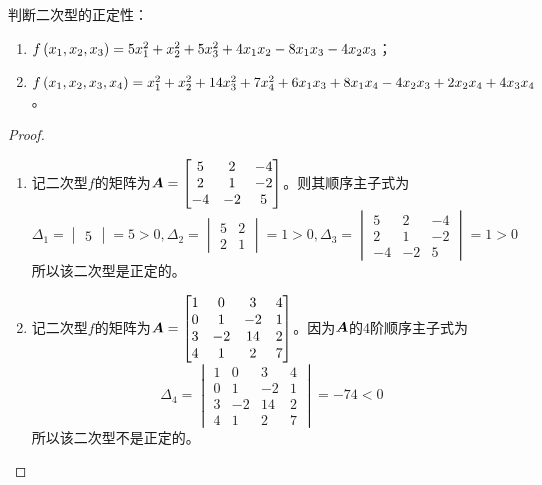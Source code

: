 \begin{problem}
判断二次型的正定性：
\begin{enumerate}
    \item \(f\left( x_1,x_2,x_3 \right)=5x_1^2+x_2^2+5x_3^2+4x_1x_2-8x_1x_3-4x_2x_3\)；
    \item \(f\left( x_1,x_2,x_3,x_4 \right)=x_1^2+x_2^2+14x_3^2+7x_4^2+6x_1x_3+8x_1x_4-4x_2x_3+2x_2x_4+4x_3x_4\)。
\end{enumerate}
\end{problem}
\begin{proof}
    \begin{enumerate}
        \item {
              记二次型\(f\)的矩阵为\(\boldsymbol{A}=\begin{bmatrix}5&2&-4\\2&1&-2\\-4&-2&5\end{bmatrix}\)。则其顺序主子式为
              \begin{equation*}
                  \Delta_1=\begin{vmatrix}5\end{vmatrix}=5>0,\Delta_2=\begin{vmatrix}5&2\\2&1\end{vmatrix}=1>0,\Delta_3=\begin{vmatrix}5&2&-4\\2&1&-2\\-4&-2&5\end{vmatrix}=1>0
              \end{equation*}
              所以该二次型是正定的。
              }
        \item {
              记二次型\(f\)的矩阵为\(\boldsymbol{A}=\begin{bmatrix}1&0&3&4\\0&1&-2&1\\3&-2&14&2\\4&1&2&7\end{bmatrix}\)。因为\(\boldsymbol{A}\)的\(4\)阶顺序主子式为
              \begin{equation*}
                  \Delta_4=\begin{vmatrix}1&0&3&4\\0&1&-2&1\\3&-2&14&2\\4&1&2&7\end{vmatrix}=-74<0
              \end{equation*}
              所以该二次型不是正定的。
              }
    \end{enumerate}
\end{proof}

